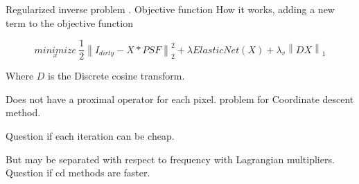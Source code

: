 Regularized inverse problem  \cite{ferrari2015multi}. Objective function 
How it works, adding a new term to the objective function

\begin{equation}\label{cd:deconv}
\underset{x}{minimize} \: \frac{1}{2} \left \| I_{dirty} - X * PSF \right \|_2^2 + \lambda ElasticNet(X) + \lambda_v \left \| DX \right \|_1
\end{equation}

Where $D$ is the Discrete cosine transform.

Does not have a proximal operator for each pixel. problem for Coordinate descent method.

Question if each iteration can be cheap.

But may be separated with respect to frequency with Lagrangian multipliers. Question if cd methods are faster.

